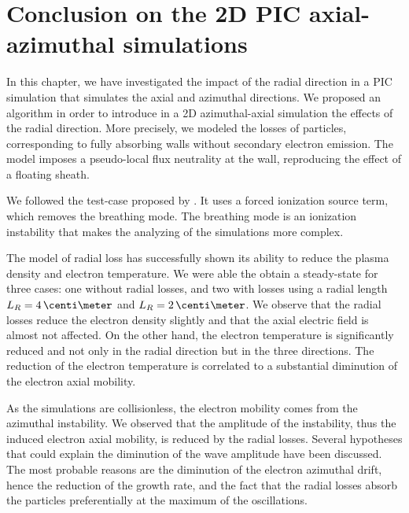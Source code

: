 
\section{Conclusion on the 2D PIC axial-azimuthal simulations}

In this chapter, we have investigated the impact of the radial direction in a \ac{PIC} simulation that simulates the axial and azimuthal directions.
We proposed an algorithm in order to introduce in a \ac{2D} azimuthal-axial simulation the effects of the radial direction.
More precisely, we modeled the losses of particles, corresponding to fully absorbing walls without secondary electron emission.
The model imposes a pseudo-local flux neutrality at the wall, reproducing the effect of a floating sheath.

We followed the test-case proposed by \citet{boeuf2018}.
It uses a forced ionization source term, which removes the breathing mode.
The breathing mode is an ionization instability that makes the analyzing of the simulations more complex.

The model of radial loss has successfully shown its ability to reduce the plasma density and electron temperature.
We were able the obtain a steady-state for three cases\string: one without radial losses, and two with losses using a radial length $L_R=4\,\centi\meter$ and $L_R=2\,\centi\meter$.
We observe that the radial losses reduce the electron density slightly and that the axial electric field is almost not affected.
On the other hand, the electron temperature is significantly reduced and not only in the radial direction but in the three directions.
The reduction of the electron temperature is correlated to a substantial diminution of the electron axial mobility.

As the simulations are collisionless, the electron mobility comes from the azimuthal instability.
We observed that the amplitude of the instability, thus the induced electron axial mobility, is reduced by the radial losses.
Several hypotheses that could explain the diminution of the wave amplitude have been discussed.
The most probable reasons are the diminution of the electron azimuthal drift, hence the reduction of the growth rate, and the fact that the radial losses absorb the particles preferentially at the maximum of the oscillations.

